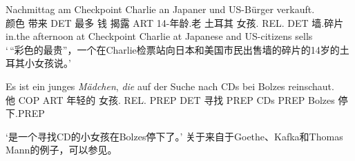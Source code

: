       Nachmittag am Checkpoint Charlie an Japaner und US-Bürger verkauft.\footnotemark\\
颜色 带来 DET 最多 钱 揭露 ART 14-年龄.老 土耳其 女孩.\neu{} REL.\fem{} DET 墙.碎片
in.the afternoon at Checkpoint Charlie at Japanese and US-citizens sells\\  
\glt `\,“彩色的最贵”，一个在Charlie检票站向日本和美国市民出售墙的碎片的14岁的土耳其小女孩说。'
\ex 
{\raggedright
\gll Es ist ein junges {\em Mädchen\/}, {\em die\/} auf der Suche nach CDs bei Bolzes reinschaut.\footnotemark\\
	 他 COP ART 年轻的 女孩.\neu{} REL.\fem{} PREP DET 寻找 PREP CDs PREP Bolzes 停下.PREP\\
\par}
\glt `是一个寻找CD的小女孩在Bolzes停下了。' 
\zl
关于来自于Goethe、Kafka和Thomas Mann的例子，可以参见。

